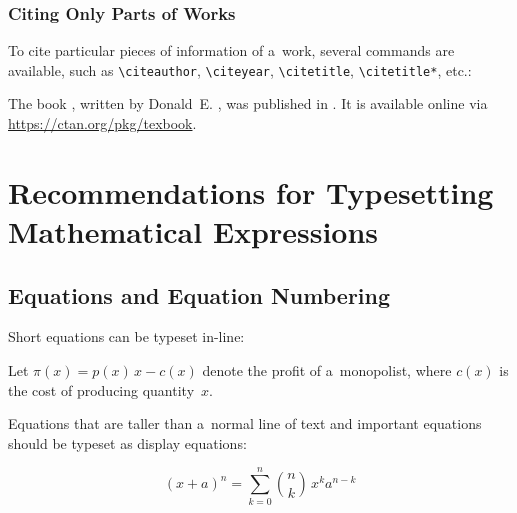 \documentclass[11pt, a4paper, oneside]{article}
\theoremstyle{Plain}
\theoremstyle{Definition}
\theoremstyle{Remark}
\begin{document}
\subsubsection{Citing Only Parts of Works}
To cite particular pieces of information of a~work, several commands are available, such as \verb|\citeauthor|, \verb|\citeyear|, \verb|\citetitle|, \verb|\citetitle*|, etc.:
\begin{longtblr}{}
	The book , written by Donald~E. \citeauthor{knuth:ct:a}, was published in \citeyear{knuth:ct:a}. It is available online via  \url{https://ctan.org/pkg/texbook}.%
\end{longtblr}


\section{Recommendations for Typesetting Mathematical Expressions}
\label{sec:math}

\subsection{Equations and Equation Numbering}
Short equations can be typeset in-line:
\begin{longtblr}{}
	Let $\pi(x) = p(x)\,x - c(x)$ denote the profit of a~monopolist, where $c(x)$ is the cost of producing quantity~$x$.
\end{longtblr}

Equations that are taller than a~normal line of text and important equations should be typeset as display equations:
\begin{longtblr}{}
	\begin{minipage}{\linewidth}\noindent%
		\begin{equation}
			(x+a)^n= \sum_{k=0}^n \binom{n}{k} \, x^k a^{n-k}
		\end{equation}%
	\end{minipage}\vspace{0.333\smallskipamount}
\end{longtblr}
\end{document}
